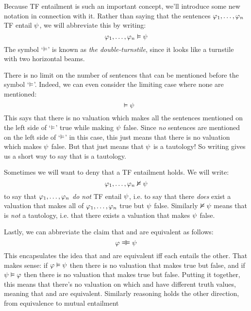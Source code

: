 Because TF entailment is such an important concept, we'll introduce some new notation in connection with it.  Rather than saying that the sentences $\mathcal{\varphi}_1, \ldots, \mathcal{\varphi}_n$ TF entail $\mathcal{\psi}$, we will abbreviate this by writing:
	$$\mathcal{\varphi}_1, \ldots, \mathcal{\varphi}_n \vDash \mathcal{\psi}$$
The symbol `$\vDash$' is known as \emph{the double-turnstile}, since it looks like a turnstile with two horizontal beams.

There is no limit on the number of sentences that can be mentioned before the symbol `$\vDash$'. Indeed, we can even consider the limiting case where none are mentioned:
	$$\phantom{\meta{\varphi}}\entails \meta{\psi}$$
This says that there is no valuation which makes all the sentences mentioned on the left side of `$\vDash$' true while making $\mathcal{\psi}$ false. Since \emph{no} sentences are mentioned on the left side of `$\vDash$' in this case, this just means that there is no valuation which makes $\mathcal{\psi}$ false. But that just means that $\mathcal{\psi}$ is a tautology!  So writing \entails \meta{\psi} gives us a short way to say that \meta{\psi} is a tautology. %

Sometimes we will want to deny that a TF entailment holds.  We will write:
$$\mathcal{\varphi}_1, \ldots, \mathcal{\varphi}_n \nvDash\mathcal{\psi}$$
to say that $\mathcal{\varphi}_1, \ldots, \mathcal{\varphi}_n$ \emph{do not} TF entail $\mathcal{\psi}$, i.e. to say that there \emph{does} exist a valuation that makes all of $\mathcal{\varphi}_1, \ldots, \mathcal{\varphi}_n$ true but $\mathcal{\psi}$ false. Similarly $\nvDash \mathcal{\psi}$ means that \meta{\psi} is \emph{not} a tautology, i.e. that there exists a valuation that makes $\mathcal{\psi}$ false.

Lastly, we can abbreviate the claim that \meta{\varphi} and \meta{\psi} are equivalent as follows:
$$\meta{\varphi} \lequiv \meta{\psi}$$
This encapsulates the idea that \meta{\varphi} and \meta{\psi} are equivalent iff each entails the other.  That makes sense: if $\mathcal{\varphi} \vDash \mathcal{\psi}$ then there is no valuation that makes \meta{\varphi} true but \meta{\psi} false, and if $\mathcal{\psi} \vDash \mathcal{\varphi}$ then there is no valuation that makes \meta{\psi} true but \meta{\varphi} false.  Putting it together, this means that there's no valuation on which \meta{\varphi} and \meta{\psi} have different truth values, meaning that \meta{\varphi} and \meta{\psi} are equivalent.  Similarly reasoning holds the other direction, from equivalence to mutual entailment


